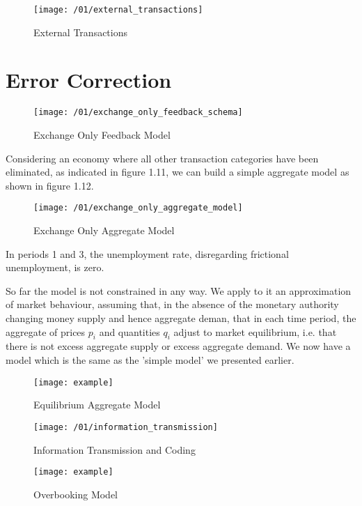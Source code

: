\begin{figure}
\centering
\texttt{[image: /01/external\_transactions]}
\caption{External Transactions}
\label{fig:external_transactions}
\end{figure}

\section{Error Correction}

\begin{figure}
\centering
\texttt{[image: /01/exchange\_only\_feedback\_schema]}
\caption{Exchange Only Feedback Model}
\label{fig:exchange_only_feedback_schema}
\end{figure}

Considering an economy where all other transaction categories have been eliminated, as
indicated in figure 1.11, we can build a simple aggregate model as shown in figure 1.12.

\begin{figure}
\centering
\texttt{[image: /01/exchange\_only\_aggregate\_model]}
\caption{Exchange Only Aggregate Model}
\label{fig:exchange_only_aggregate_model}
\end{figure}

In periods 1 and 3, the unemployment rate, disregarding frictional unemployment, is zero.

So far the model is not constrained in any way. We apply to it an approximation of market behaviour,
assuming that, in the absence of the monetary authority changing money supply and hence aggregate
deman, that in each time period, the aggregate of prices \(p_i\) and quantities \(q_i\) adjust to
market equilibrium, i.e. that there is not excess aggregate supply or excess aggregate demand. We
now have a model which is the same as the 'simple model' we presented earlier.

\begin{figure}
\centering
\texttt{[image: example]}
\caption{Equilibrium Aggregate Model}
\label{fig:equilibrium_aggregate_model}
\end{figure}

\begin{figure}
\centering
\texttt{[image: /01/information\_transmission]}
\caption{Information Transmission and Coding}
\label{fig:information_transmission}
\end{figure}

\begin{figure}
\centering
\texttt{[image: example]}
\caption{Overbooking Model}
\label{fig:overbooking}
\end{figure}

